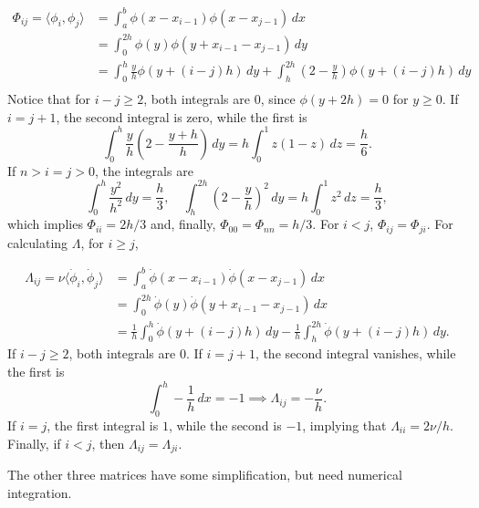 \documentclass[12pt]{article}
\newcommand{\inner}[2]{\langle{} #1, #2 \rangle{}}
\theoremstyle{definition}
\begin{document}
\[
\begin{split}
    \Phi_{ij} = \inner{\phi_i}{\phi_j} &= \int_a^b \phi(x-x_{i-1})\phi(x-x_{j-1}) \, dx \\
    &= \int_{0}^{2h} \phi(y)\phi(y+x_{i-1}-x_{j-1}) \, dy \\
    &= \int_{0}^{h} \frac{y}{h}\phi(y+(i-j)h) \, dy + \int_{h}^{2h} \left(2-\frac{y}{h}\right)\phi(y+(i-j)h) \, dy \\
\end{split}
\]
Notice that for $i-j\ge 2$, both integrals are $0$, since $\phi(y+2h) = 0$ for $y \ge 0$.
If $i=j+1$, the second integral is zero, while the first is 
\[
\int_0^h \frac{y}{h}\left(2-\frac{y+h}{h}\right) \, dy = h\int_0^1 z\left(1-z\right) \, dz = \frac{h}{6}.
\]
If $n > i=j > 0$, the integrals are 
\[
\int_{0}^{h} \frac{y^2}{h^2}\, dy = \frac{h}{3},  \quad \int_{h}^{2h} {\left(2-\frac{y}{h}\right)}^2 \, dy =  h\int_{0}^{1} z^2 \, dz = \frac{h}{3},
\]
which implies $\Phi_{ii} = 2h/3$ and, finally, $\Phi_{00} = \Phi_{nn} = h/3$. 
For $i < j$, $\Phi_{ij} = \Phi_{ji}$.
For calculating $\Lambda$, for $i \ge j$,

\[
\begin{split}
    \Lambda_{ij} = \nu \inner{\dot{\phi}_i}{\dot{\phi}_j} &= \int_a^b \dot\phi(x-x_{i-1})\dot\phi(x-x_{j-1}) \, dx \\
    &= \int_0^{2h} \dot\phi(y)\dot\phi(y + x_{i-1}-x_{j-1}) \, dx \\
    &= \frac{1}{h} \int_{0}^{h} \dot\phi(y+(i-j)h) \, dy - \frac{1}{h}\int_{h}^{2h} \dot\phi(y+(i-j)h) \, dy.
\end{split}
\]
If $i-j \ge 2$, both integrals are $0$.
If $i=j+1$, the second integral vanishes, while the first is 
\[
\int_0^h -\frac{1}{h} \, dx = -1 \implies \Lambda_{ij} = -\frac{\nu}{h}.
\]
If $i=j$, the first integral is $1$, while the second is $-1$, implying that $\Lambda_{ii} = 2\nu/h$.
Finally, if $i < j$, then $\Lambda_{ij} = \Lambda_{ji}$.

The other three matrices have some simplification, but need numerical integration.
\end{document}

